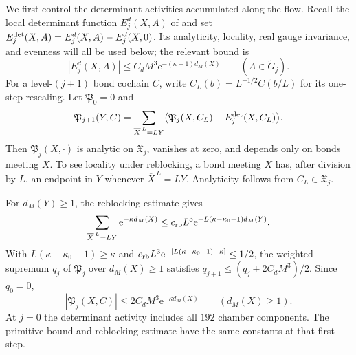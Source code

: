 We first control the determinant activities accumulated
along the flow. Recall the local determinant
function $E_j^d(X,A)$ of
\cite[Proposition~6.1]{FermionBlock} and set
$E_j^{\rm det}(X,A)=E_j^d(X,A)-E_j^d(X,0)$.
Its analyticity, locality, real gauge invariance,
and evenness will all be used below; the relevant
bound is
\begin{equation}\label{eq:interacting-determinant-input}
 |E_j^d(X,A)|\le C_dM^3\mathrm e^{-(\kappa+1)d_M(X)}
                       \qquad(A\in\widetilde G_j).
\end{equation}
For a level-$(j+1)$ bond cochain $C$, write
$C_L(b)=L^{-1/2}C(b/L)$ for its one-step rescaling.
Let $\mathfrak P_0=0$ and
\begin{equation}\label{eq:interacting-P-recursion}
 \mathfrak P_{j+1}(Y,C)=
 \sum_{\overline X^{\,L}=LY}
       \bigl(\mathfrak P_j(X,C_L)+E_j^{\rm det}(X,C_L)\bigr).
\end{equation}
Then $\mathfrak P_j(X,\cdot)$ is analytic on
$\mathfrak X_j$, vanishes at zero, and depends only
on bonds meeting $X$. To see locality under
reblocking, a bond meeting $X$ has, after division
by $L$, an endpoint in $Y$ whenever
$\overline X^{\,L}=LY$. Analyticity follows from
$C_L\in\mathfrak X_j$.

For $d_M(Y)\ge1$, the reblocking estimate gives
\[
 \sum_{\overline X^{\,L}=LY}\mathrm e^{-\kappa d_M(X)}
 \le c_{\rm rb}L^3\mathrm e^{-L(\kappa-\kappa_0-1)d_M(Y)}.
\]
With
$L(\kappa-\kappa_0-1)\ge\kappa$ and
$c_{\rm rb}L^3\mathrm e^{-[L(\kappa-\kappa_0-1)-\kappa]}\le1/2$,
the weighted supremum $q_j$ of $\mathfrak P_j$
over $d_M(X)\ge1$ satisfies
$q_{j+1}\le(q_j+2C_dM^3)/2$. Since $q_0=0$,
\begin{equation}\label{eq:interacting-P-bound}
 |\mathfrak P_j(X,C)|\le2C_dM^3\mathrm e^{-\kappa d_M(X)}
                           \qquad(d_M(X)\ge1).
\end{equation}
At $j=0$ the determinant activity includes all
$192$ chamber components. The primitive bound and
reblocking estimate have the same constants at
that first step.

